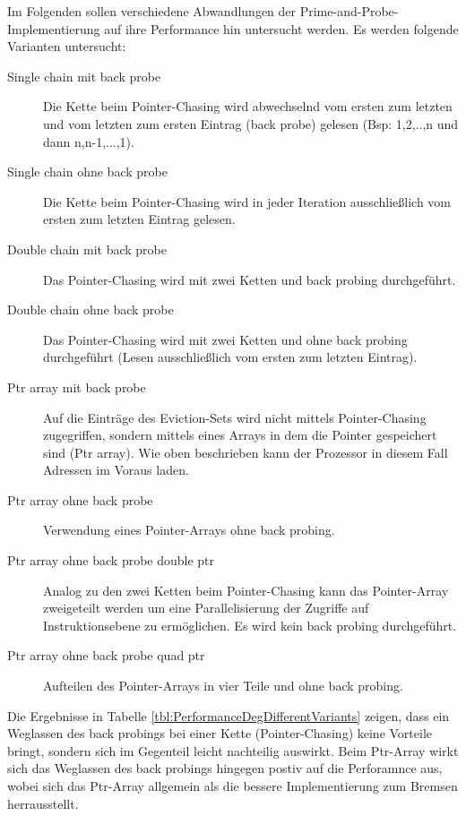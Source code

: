 Im Folgenden sollen verschiedene Abwandlungen der Prime-and-Probe-Implementierung auf ihre Performance hin untersucht werden. Es werden folgende Varianten untersucht:

\begin{description}
\item[Single chain mit back probe]
Die Kette beim Pointer-Chasing wird abwechselnd vom ersten zum letzten und vom letzten zum ersten Eintrag (back probe) gelesen (Bsp: 1,2,..,n und dann n,n-1,...,1).
\item[Single chain ohne back probe]
Die Kette beim Pointer-Chasing wird in jeder Iteration ausschließlich vom ersten zum letzten Eintrag gelesen. 
\item[Double chain mit back probe]
Das Pointer-Chasing wird mit zwei Ketten und back probing durchgeführt.
\item[Double chain ohne back probe]
Das Pointer-Chasing wird mit zwei Ketten und ohne back probing durchgeführt (Lesen ausschließlich vom ersten zum letzten Eintrag).
\item[Ptr array mit back probe]
Auf die Einträge des Eviction-Sets wird nicht mittels Pointer-Chasing zugegriffen, sondern mittels eines Arrays in dem die Pointer gespeichert sind (Ptr array). Wie oben beschrieben kann der Prozessor in diesem Fall Adressen im Voraus laden.
\item[Ptr array ohne back probe]
Verwendung eines Pointer-Arrays ohne back probing.
\item[Ptr array ohne back probe double ptr]
Analog zu den zwei Ketten beim Pointer-Chasing kann das Pointer-Array zweigeteilt werden um eine Parallelisierung der Zugriffe auf Instruktionsebene zu ermöglichen. Es wird kein back probing durchgeführt.
\item[Ptr array ohne back probe quad ptr]
Aufteilen des Pointer-Arrays in vier Teile und ohne back probing.
\end{description}

Die Ergebnisse in Tabelle \ref{tbl:PerformanceDegDifferentVariants} zeigen, dass ein Weglassen des back probings bei einer Kette (Pointer-Chasing) keine Vorteile bringt, sondern sich im Gegenteil leicht nachteilig auswirkt.
Beim Ptr-Array wirkt sich das Weglassen des back probings hingegen postiv auf die Perforamnce aus, wobei sich das Ptr-Array allgemein als die bessere Implementierung zum Bremsen herrausstellt.


